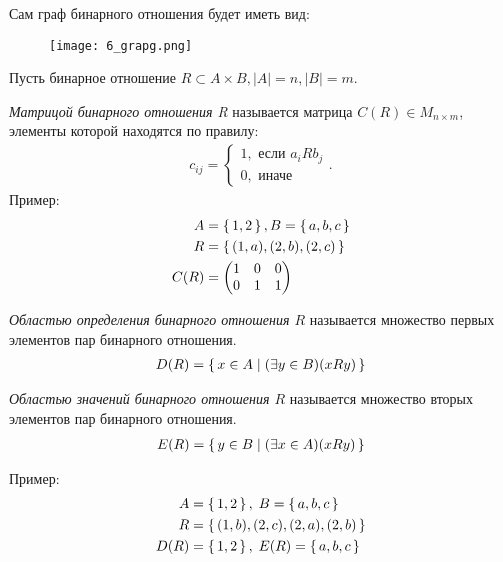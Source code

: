 Сам граф бинарного отношения будет иметь вид:
\begin{figure}[h]
    \centering
    \texttt{[image: 6\_grapg.png]}
\end{figure}

Пусть бинарное отношение $R \subset A \times B, |A|=n, |B|=m$.
\begin{definition}
    \textit{Матрицой бинарного отношения R} называется матрица \mbox{$C(R) \in M_{n \times m}$},
    элементы которой находятся по правилу:
    \begin{align*}
        c_{ij}=\begin{cases}
        1, \text{ если } a_iRb_j \\
        0, \text{ иначе} 
        \end{cases}.
    \end{align*}
    Пример:
    \begin{align*}
        A&=\set{1,2}, B=\set{a,b,c} \\
        R&=\set{(1,a),(2,b),(2,c)} \\
        C(R)&=\begin{pmatrix}
            1 & 0 & 0 \\
            0 & 1 & 1
        \end{pmatrix}
    \end{align*}
\end{definition}

\begin{definition}
    \textit{Областью определения бинарного отношения $R$} называется
    множество первых элементов пар бинарного отношения.
    \begin{align*}
        D(R)=\set{x \in A | (\exists y \in B)(xRy)}
    \end{align*}
\end{definition}

\begin{definition}
    \textit{Областью значений бинарного отношения $R$} называется
    множество вторых элементов пар бинарного отношения.
    \begin{align*}
        E(R)=\set{y \in B | (\exists x \in A)(xRy)}
    \end{align*}
\end{definition}

Пример:
\begin{align*}
    A&=\set{1,2}, \; B=\set{a,b,c} \\
    R&=\set{(1,b),(2,c),(2,a),(2,b)} \\
    D(R)&=\set{1,2}, \; E(R)=\set{a,b,c}
\end{align*}

